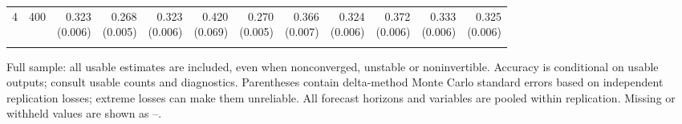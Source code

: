 \begin{table}[p]
{\begin{tabular}{llrrrrrrrrrr}
4 & 400 & \shortstack{0.323\\(0.006)} & \shortstack{0.268\\(0.005)} & \shortstack{0.323\\(0.006)} & \shortstack{0.420\\(0.069)} & \shortstack{0.270\\(0.005)} & \shortstack{0.366\\(0.007)} & \shortstack{0.324\\(0.006)} & \shortstack{0.372\\(0.006)} & \shortstack{0.333\\(0.006)} & \shortstack{0.325\\(0.006)} \\
\addlinespace
\bottomrule\end{tabular}}
\par\medskip
\begin{minipage}{\linewidth}\footnotesize Full sample: all usable estimates are included, even when nonconverged, unstable or noninvertible. Accuracy is conditional on usable outputs; consult usable counts and diagnostics. Parentheses contain delta-method Monte Carlo standard errors based on independent replication losses; extreme losses can make them unreliable. All forecast horizons and variables are pooled within replication.  Missing or withheld values are shown as --.\end{minipage}
\end{table}

